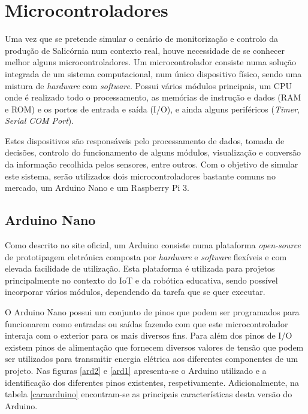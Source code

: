 \section{Microcontroladores}

Uma vez que se pretende simular o cenário de monitorização e controlo da produção de Salicórnia num contexto real, houve necessidade de se conhecer melhor alguns microcontroladores. Um microcontrolador consiste numa solução integrada de um sistema computacional, num único dispositivo físico, sendo uma mistura de \textit{hardware} com \textit{software}. Possui vários módulos principais, um \ac{CPU} onde é realizado todo o processamento, as memórias de instrução e dados (\ac{RAM} e \ac{ROM}) e os portos de entrada e saída (\ac{I/O}), e ainda alguns periféricos (\textit{Timer}, \textit{Serial COM Port})\cite{microcontrollers}. 

Estes dispositivos são responsáveis pelo processamento de dados, tomada de decisões, controlo do funcionamento de alguns módulos, visualização e conversão da informação recolhida pelos sensores, entre outros. Com o objetivo de simular este sistema, serão utilizados dois microcontroladores bastante comuns no mercado, um Arduino Nano e um Raspberry Pi 3.  


\subsection{Arduino Nano}


Como descrito no site oficial\cite{Banzi2012}, um Arduino consiste numa plataforma \textit{open-source} de prototipagem eletrónica composta por \textit{hardware} e \textit{software} flexíveis e com elevada facilidade de utilização. Esta plataforma é utilizada para projetos principalmente no contexto do \ac{IoT} e da robótica educativa, sendo possível incorporar vários módulos, dependendo da tarefa que se quer executar. 

O Arduino Nano\cite{Banzi2012} possui um conjunto de pinos que podem ser programados para funcionarem como entradas ou saídas fazendo com que este  microcontrolador interaja com o exterior para os mais diversos fins. Para além dos pinos de \ac{I/O} existem pinos de alimentação que fornecem diversos valores de tensão que podem ser utilizados para transmitir energia elétrica aos diferentes componentes de um projeto. Nas figuras \ref{ard2} e \ref{ard1} apresenta-se o Arduino utilizado e a identificação dos diferentes pinos existentes, respetivamente. Adicionalmente, na tabela \ref{caraarduino} encontram-se as principais características desta versão do Arduino.


